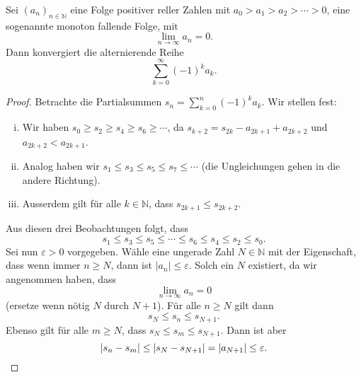\documentclass[../main.tex]{subfiles}
\begin{document}
\begin{claim}[Leibnizkriterium]
  Sei ${(a_{n})}_{n \in \mathbb{N}}$ eine Folge
  positiver reller Zahlen mit
  $a_0 > a_1 > a_2 > \cdots > 0$, eine sogenannte
  monoton fallende Folge, mit 
  \[
    \lim_{n \to \infty}a_n = 0.
  \]
  Dann konvergiert die alternierende Reihe
  \[
    \sum_{k=0}^{\infty} {(-1)}^k a_k.
  \]
\end{claim}

\begin{proof}
  Betrachte die Partialsummen $s_n = \sum_{k=0}^{n} {(-1)}^k a_k$.
  Wir stellen fest:
  \begin{enumerate}[(i)]
    \item Wir haben $s_0 \geq s_2 \geq s_4 \geq s_6 \geq \cdots$,
      da $s_{k+2} = s_{2k} - a_{2k+1} + a_{2k+2}$ und
      $a_{2k+2}<a_{2k+1}$.
    \item Analog haben wir 
      $s_1 \leq s_3 \leq s_5 \leq s_7 \leq \cdots$ (die
      Ungleichungen gehen in die andere Richtung).
    \item Ausserdem gilt für alle $k \in \mathbb{N}$, dass
      $s_{2k+1} \leq s_{2k+2}$.
  \end{enumerate}
  Aus diesen drei Beobachtungen folgt, dass
  \[
    s_1 \leq s_3 \leq s_5 \leq \cdots \leq s_6 \leq s_4 \leq
    s_2 \leq s_0.
  \]
  Sei nun $\varepsilon > 0$ vorgegeben. Wähle 
  eine ungerade Zahl $N \in \mathbb{N}$ 
  mit der Eigenschaft, dass wenn immer $n \geq N$, dann
  ist $|a_n| \leq \varepsilon$. Solch ein $N$ existiert,
  da wir angenommen haben, dass
  \[
    \lim_{n \to \infty} a_n = 0
  \]
  (ersetze wenn nötig $N$ durch $N + 1$).
  Für alle $n \geq N$ gilt dann
  \[
    s_N \leq s_n \leq s_{N+1}.
  \]
  Ebenso gilt für alle $m \geq N$, dass
  $s_N \leq s_m \leq s_{N+1}$. Dann ist aber
  \[
    |s_n - s_m| \leq |s_N - s_{N+1}| = |a_{N+1}| \leq \varepsilon.
    \qedhere
  \]
\end{proof}
\end{document}
